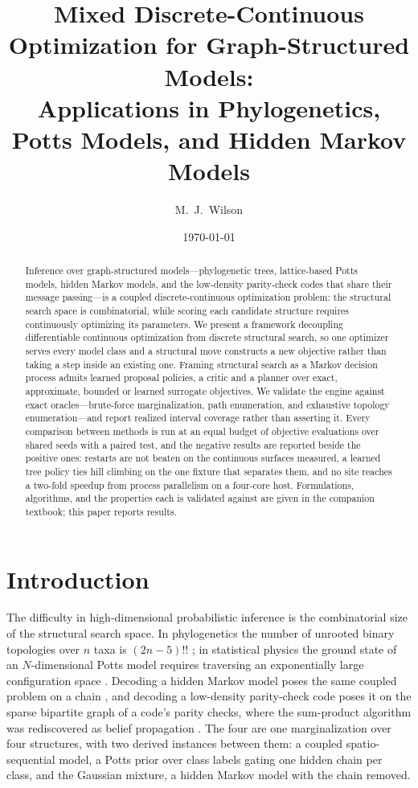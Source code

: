 \documentclass[11pt,a4paper]{article}
\title{Mixed Discrete-Continuous Optimization for Graph-Structured Models: \\
Applications in Phylogenetics, Potts Models, and Hidden Markov Models}
\author{M.\ J.\ Wilson}
\date{\today}
\begin{document}
\maketitle

\begin{abstract}
\noindent
Inference over graph-structured models---phylogenetic trees, lattice-based
Potts models, hidden Markov models, and the low-density parity-check codes
that share their message passing---is a coupled discrete-continuous
optimization problem: the structural search space is combinatorial, while
scoring each candidate structure requires continuously optimizing its
parameters. We present a framework decoupling differentiable continuous
optimization from discrete structural search, so one optimizer serves every
model class and a structural move constructs a new objective rather than taking
a step inside an existing one. Framing structural search as a Markov decision
process admits learned proposal policies, a critic and a planner over exact,
approximate, bounded or learned surrogate objectives.
We validate the engine against exact oracles---brute-force marginalization,
path enumeration, and exhaustive topology enumeration---and report realized
interval coverage rather than asserting it. Every comparison between methods
is run at an equal budget of objective evaluations over shared seeds with a
paired test, and the negative results are reported beside the positive ones:
restarts are not beaten on the continuous surfaces measured, a learned tree
policy ties hill climbing on the one fixture that separates them, and no
site reaches a two-fold speedup from process parallelism on a four-core host.
Formulations, algorithms, and the properties each is validated against are
given in the companion textbook; this paper reports results.
\end{abstract}

\tableofcontents

\section{Introduction}
\label{sec:intro}

The difficulty in high-dimensional probabilistic inference is the combinatorial
size of the structural search space. In phylogenetics the number of unrooted
binary topologies over $n$ taxa is $(2n-5)!!$ \citep{rosen2019}; in statistical
physics the ground state of an $N$-dimensional Potts model requires traversing
an exponentially large configuration space \citep{mezard2009}. Decoding a
hidden Markov model poses the same coupled problem on a chain
\citep{mackay2003}, and decoding a low-density parity-check code poses it on
the sparse bipartite graph of a code's parity checks, where the sum-product
algorithm was rediscovered as belief propagation \citep{kschischang2001}. The
four are one marginalization over four structures, with two derived instances
between them: a coupled spatio-sequential model, a Potts prior over class
labels gating one hidden chain per class, and the Gaussian mixture, a hidden
Markov model with the chain removed.
\end{document}
